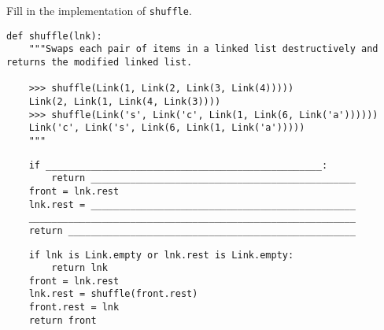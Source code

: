 \begin{blocksection}
\question Fill in the implementation of \lstinline$shuffle$.

\begin{lstlisting}
def shuffle(lnk):
    """Swaps each pair of items in a linked list destructively and returns the modified linked list.

    >>> shuffle(Link(1, Link(2, Link(3, Link(4)))))
    Link(2, Link(1, Link(4, Link(3))))
    >>> shuffle(Link('s', Link('c', Link(1, Link(6, Link('a'))))))
    Link('c', Link('s', Link(6, Link(1, Link('a')))))
    """
\end{lstlisting}

\ifprintanswers\else
\begin{lstlisting}
    if _________________________________________________:
        return _______________________________________________
    front = lnk.rest
    lnk.rest = _______________________________________________
    __________________________________________________________
    return ___________________________________________________
\end{lstlisting}
\fi

\begin{solution}
\begin{lstlisting}
    if lnk is Link.empty or lnk.rest is Link.empty:
        return lnk
    front = lnk.rest
    lnk.rest = shuffle(front.rest)
    front.rest = lnk
    return front
\end{lstlisting}
\end{solution}
\end{blocksection}

